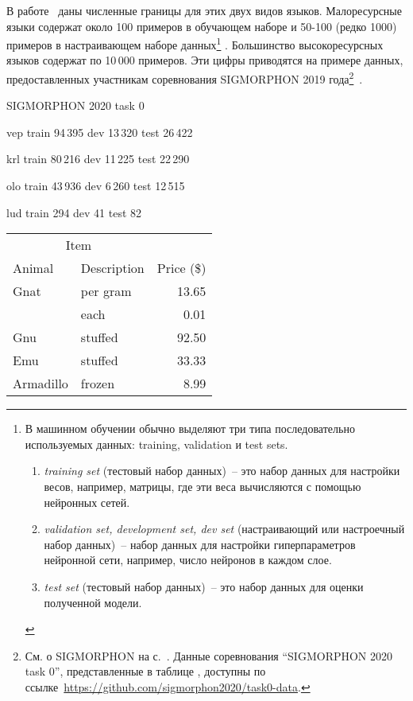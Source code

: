 В работе~\cite{Anastasopoulos2019Pushing_Limits_Low-Resource_MI} 
даны численные границы для этих двух видов языков.
Малоресурсные языки содержат около 100 примеров в обучающем наборе 
и 50-100 (редко 1000) примеров в настраивающем наборе данных\footnote{%
    В машинном обучении обычно выделяют три типа 
    последовательно используемых данных: training, validation и test sets.
    \begin{enumerate}[label=(\roman*)]
        \item \emph{training set} (тестовый набор данных)~-- 
            это набор данных для настройки весов, например, матрицы, 
            где эти веса вычисляются с помощью нейронных сетей.

        \item \emph{validation set, development set, dev set} 
            (настраивающий или настроечный набор данных)~-- 
            набор данных для настройки гиперпараметров нейронной сети, 
            например, число нейронов в каждом слое.

        \item \emph{test set} (тестовый набор данных)~-- это набор данных 
            для оценки полученной модели. 
    \end{enumerate}
    }%
%
. 
Большинство высокоресурсных языков содержат по 10\,000 примеров.
Эти цифры приводятся на примере данных, 
предоставленных участникам соревнования SIGMORPHON 2019 года\footnote{%
    См. о SIGMORPHON на с.~\pageref{SIGMORPHON}.
    Данные соревнования ``SIGMORPHON 2020 task 0'', представленные 
    в таблице , 
    доступны по 
    ссылке~\url{https://github.com/sigmorphon2020/task0-data}.
}~\cite{Anastasopoulos2019Pushing_Limits_Low-Resource_MI}.


SIGMORPHON 2020 task 0

vep  train 94\,395 dev 13\,320 test 26\,422

krl  train 80\,216 dev 11\,225 test 22\,290

olo  train 43\,936 dev 6\,260 test 12\,515

lud  train 294 dev 41 test 82

\begin{tabular}{llr}
\hline
\multicolumn{2}{c}{Item} \\
\cline{1-2}
Animal    & Description & Price (\$) \\
\hline
Gnat      & per gram    & 13.65      \\
          & each        & 0.01       \\
Gnu       & stuffed     & 92.50      \\
Emu       & stuffed     & 33.33      \\
Armadillo & frozen      & 8.99       \\
\hline
\end{tabular}




